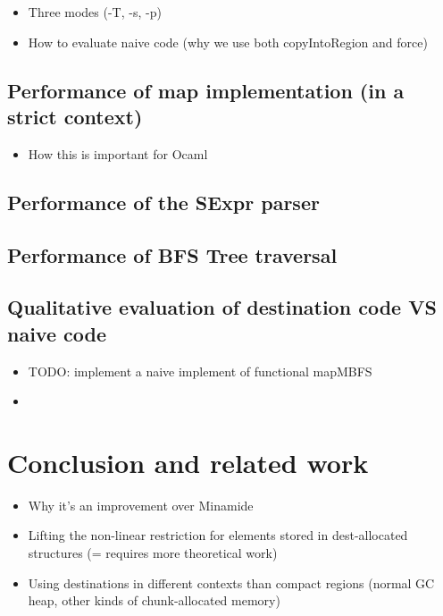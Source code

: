 \documentclass[english]{jflart}
\begin{document}
\begin{itemize}
\item Three modes (-T, -s, -p)
\item How to evaluate naive code (why we use both copyIntoRegion and force)
\end{itemize}

\subsection{Performance of map implementation (in a strict context)}

\begin{itemize}
\item How this is important for Ocaml
\end{itemize}

\subsection{Performance of the SExpr parser}

\subsection{Performance of BFS Tree traversal}\label{ssec:benchmark-parser}

\subsection{Qualitative evaluation of destination code VS naive code}

\begin{itemize}
\item TODO: implement a naive implement of functional mapMBFS
\item \end{itemize}

\section{Conclusion and related work}
\begin{itemize}
\item Why it's an improvement over Minamide

\item Lifting the non-linear restriction for elements stored in dest-allocated structures (= requires more theoretical work)

\item Using destinations in different contexts than compact regions (normal GC heap, other kinds of chunk-allocated memory)
\end{itemize}
\end{document}
